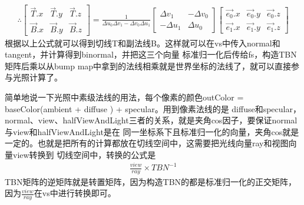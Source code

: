\begin{gather*}
    \therefore \begin{bmatrix}
        \overrightarrow{T}.x & \overrightarrow{T}.y & \overrightarrow{T}.z \\ 
        \overrightarrow{B}.x & \overrightarrow{B}.y & \overrightarrow{B}.z  
    \end{bmatrix} = \frac{1}{\Delta u_{0} \Delta v_{1} - \Delta v_{0} \Delta u_{1}} \begin{bmatrix}
        \Delta v_{1} & -\Delta v_{0} \\ 
        -\Delta u_{1} & \Delta u_{0}
    \end{bmatrix} \begin{bmatrix}
        \overrightarrow{e_{0}}.x & \overrightarrow{e_{0}}.y & \overrightarrow{e_{0}}.z \\ 
        \overrightarrow{e_{1}}.x & \overrightarrow{e_{1}}.y & \overrightarrow{e_{1}}.z  
    \end{bmatrix} 
\end{gather*}
根据以上公式就可以得到切线T和副法线B。这样就可以在vs中传入normal和tangent，并计算得到binormal，并把这三个向量
标准归一化后传给fs，构造TBN矩阵后乘以从bump map中拿到的法线相乘就是世界坐标的法线了，就可以直接参与光照计算了。
\par
简单地说一下光照中素级法线的用法，每个像素的颜色outColor = baseColor(ambient + diffuse ) + specular。用到像素法线的是
diffuse和specular，normal、view、halfViewAndLight三者的关系，就是夹角cos因子，要保证normal与view和halfViewAndLight是在
同一坐标系下且标准归一化的向量，夹角cos就是一定的。也就是把所有的计算都放在切线空间中，这需要把光线向量ray和视图向量view转换到
切线空间中，转换的公式是
\begin{gather*}
    \frac{view}{ray} \times TBN^{-1}
\end{gather*}
TBN矩阵的逆矩阵就是转置矩阵，因为构造TBN的都是标准归一化的正交矩阵，因为$\frac{view}{ray}$在vs中进行转换即可。

